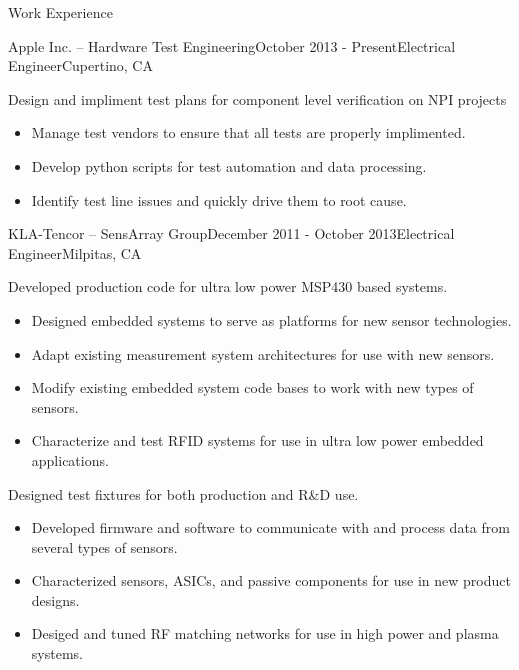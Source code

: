 \documentclass{resume} %
\begin{document}
\begin{rSection}{Work Experience}
\vspace{-0.5em}
\begin{rSubsection}{Apple Inc. -- Hardware Test Engineering}{October 2013 - Present}{Electrical Engineer}{Cupertino, CA}

\item Design and impliment test plans for component level verification on NPI projects
\begin{itemize}
\itemsep -0.5em \vspace{-0.5em}
\renewcommand{\labelitemi}{-}
\item Manage test vendors to ensure that all tests are properly implimented.
\item Develop python scripts for test automation and data processing.
\item Identify test line issues and quickly drive them to root cause.
\end{itemize}
\end{rSubsection}


\begin{rSubsection}{KLA-Tencor -- SensArray Group}{December 2011 - October 2013}{Electrical Engineer}{Milpitas, CA}
\item Developed production code for ultra low power MSP430 based systems.
\begin{itemize}
\itemsep -0.5em \vspace{-0.5em}
\renewcommand{\labelitemi}{-}
\item Designed embedded systems to serve as platforms for new sensor technologies.
\item Adapt existing measurement system architectures for use with new sensors.
\item Modify existing embedded system code bases to work with new types of sensors.
\item Characterize and test RFID systems for use in ultra low power embedded applications.
\end{itemize}

\item Designed test fixtures for both production and R\&D use.
\begin{itemize}
\itemsep -0.5em \vspace{-0.5em}
\renewcommand{\labelitemi}{-}
\item Developed firmware and software to communicate with and process data from several types of sensors.
\item Characterized sensors, ASICs, and passive components for use in new product designs.
\item Desiged and tuned RF matching networks for use in high power and plasma systems.
\end{itemize}
\end{rSubsection}


\end{rSection}
\end{document}
